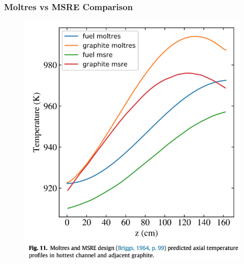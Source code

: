 \begin{frame}
  \frametitle{Moltres vs MSRE Comparison}
  \begin{figure}[t]
   \includegraphics[height=0.85\textheight]{./images/msre_temp.png}
    \end{figure}

\end{frame}

